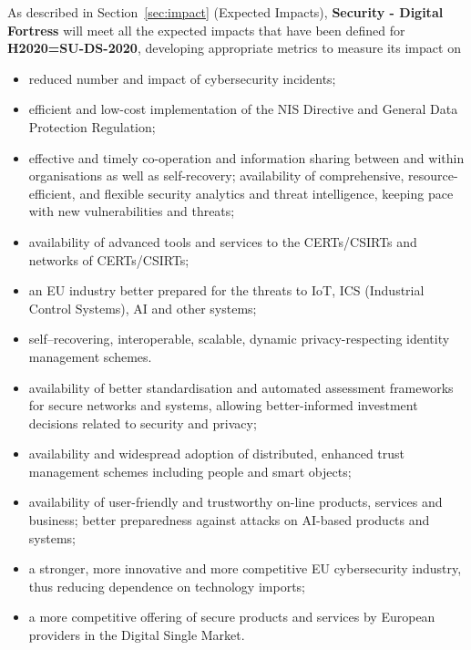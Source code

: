 \documentclass[a4paper,11pt]{article}
\newcommand{\project}[1]{\textbf{#1}\xspace}
\newcommand{\SECURITY}{\project{Security - Digital Fortress}}
\newcommand{\TheProject}{\SECURITY}
\begin{document}
As described in Section~\ref{sec:impact} (Expected Impacts), \TheProject{} will meet all the expected impacts that have been defined for \textbf{H2020=SU-DS-2020}, developing appropriate metrics to measure its impact on
\begin{itemize}
\item reduced number and impact of cybersecurity incidents;
\item efficient and low-cost implementation of the NIS Directive and General Data Protection Regulation;
\item effective and timely co-operation and information sharing between and within organisations as well as self-recovery;
availability of comprehensive, resource-efficient, and flexible security analytics and threat intelligence, keeping pace with new vulnerabilities and threats;
\item availability of advanced tools and services to the CERTs/CSIRTs and networks of CERTs/CSIRTs;
\item an EU industry better prepared for the threats to IoT, ICS (Industrial Control Systems), AI and other systems;
\item self–recovering, interoperable, scalable, dynamic privacy-respecting identity management schemes.
\item availability of better standardisation and automated assessment frameworks for secure networks and systems, allowing better-informed investment decisions related to security and privacy;
\item availability and widespread adoption of distributed, enhanced trust management schemes including people and smart objects;
\item availability of user-friendly and trustworthy on-line products, services and business;
better preparedness against attacks on AI-based products and systems;
\item a stronger, more innovative and more competitive EU cybersecurity industry, thus reducing dependence on technology imports;
\item a more competitive offering of secure products and services by European providers in the Digital Single Market.
\end{itemize}
\end{document}
